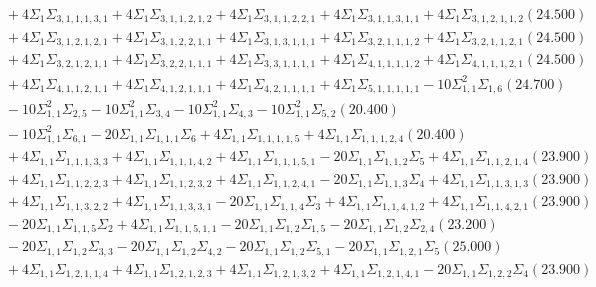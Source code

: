 \documentclass[12pt]{article}
\begin{document}
\begin{landscape}
\begin{align*}
		&\quad\quad +4\Sigma_{1}\Sigma_{3,1,1,1,3,1}+4\Sigma_{1}\Sigma_{3,1,1,2,1,2}+4\Sigma_{1}\Sigma_{3,1,1,2,2,1}+4\Sigma_{1}\Sigma_{3,1,1,3,1,1}+4\Sigma_{1}\Sigma_{3,1,2,1,1,2}(24.500) \\ 
		&\quad\quad +4\Sigma_{1}\Sigma_{3,1,2,1,2,1}+4\Sigma_{1}\Sigma_{3,1,2,2,1,1}+4\Sigma_{1}\Sigma_{3,1,3,1,1,1}+4\Sigma_{1}\Sigma_{3,2,1,1,1,2}+4\Sigma_{1}\Sigma_{3,2,1,1,2,1}(24.500) \\ 
		&\quad\quad +4\Sigma_{1}\Sigma_{3,2,1,2,1,1}+4\Sigma_{1}\Sigma_{3,2,2,1,1,1}+4\Sigma_{1}\Sigma_{3,3,1,1,1,1}+4\Sigma_{1}\Sigma_{4,1,1,1,1,2}+4\Sigma_{1}\Sigma_{4,1,1,1,2,1}(24.500) \\ 
		&\quad\quad +4\Sigma_{1}\Sigma_{4,1,1,2,1,1}+4\Sigma_{1}\Sigma_{4,1,2,1,1,1}+4\Sigma_{1}\Sigma_{4,2,1,1,1,1}+4\Sigma_{1}\Sigma_{5,1,1,1,1,1}-10\Sigma_{1,1}^{2}\Sigma_{1,6}(24.700) \\ 
		&\quad\quad -10\Sigma_{1,1}^{2}\Sigma_{2,5}-10\Sigma_{1,1}^{2}\Sigma_{3,4}-10\Sigma_{1,1}^{2}\Sigma_{4,3}-10\Sigma_{1,1}^{2}\Sigma_{5,2}(20.400) \\ 
		&\quad\quad -10\Sigma_{1,1}^{2}\Sigma_{6,1}-20\Sigma_{1,1}\Sigma_{1,1,1}\Sigma_{6}+4\Sigma_{1,1}\Sigma_{1,1,1,1,5}+4\Sigma_{1,1}\Sigma_{1,1,1,2,4}(20.400) \\ 
		&\quad\quad +4\Sigma_{1,1}\Sigma_{1,1,1,3,3}+4\Sigma_{1,1}\Sigma_{1,1,1,4,2}+4\Sigma_{1,1}\Sigma_{1,1,1,5,1}-20\Sigma_{1,1}\Sigma_{1,1,2}\Sigma_{5}+4\Sigma_{1,1}\Sigma_{1,1,2,1,4}(23.900) \\ 
		&\quad\quad +4\Sigma_{1,1}\Sigma_{1,1,2,2,3}+4\Sigma_{1,1}\Sigma_{1,1,2,3,2}+4\Sigma_{1,1}\Sigma_{1,1,2,4,1}-20\Sigma_{1,1}\Sigma_{1,1,3}\Sigma_{4}+4\Sigma_{1,1}\Sigma_{1,1,3,1,3}(23.900) \\ 
		&\quad\quad +4\Sigma_{1,1}\Sigma_{1,1,3,2,2}+4\Sigma_{1,1}\Sigma_{1,1,3,3,1}-20\Sigma_{1,1}\Sigma_{1,1,4}\Sigma_{3}+4\Sigma_{1,1}\Sigma_{1,1,4,1,2}+4\Sigma_{1,1}\Sigma_{1,1,4,2,1}(23.900) \\ 
		&\quad\quad -20\Sigma_{1,1}\Sigma_{1,1,5}\Sigma_{2}+4\Sigma_{1,1}\Sigma_{1,1,5,1,1}-20\Sigma_{1,1}\Sigma_{1,2}\Sigma_{1,5}-20\Sigma_{1,1}\Sigma_{1,2}\Sigma_{2,4}(23.200) \\ 
		&\quad\quad -20\Sigma_{1,1}\Sigma_{1,2}\Sigma_{3,3}-20\Sigma_{1,1}\Sigma_{1,2}\Sigma_{4,2}-20\Sigma_{1,1}\Sigma_{1,2}\Sigma_{5,1}-20\Sigma_{1,1}\Sigma_{1,2,1}\Sigma_{5}(25.000) \\ 
		&\quad\quad +4\Sigma_{1,1}\Sigma_{1,2,1,1,4}+4\Sigma_{1,1}\Sigma_{1,2,1,2,3}+4\Sigma_{1,1}\Sigma_{1,2,1,3,2}+4\Sigma_{1,1}\Sigma_{1,2,1,4,1}-20\Sigma_{1,1}\Sigma_{1,2,2}\Sigma_{4}(23.900) \\ 

\end{align*}
\end{landscape}
\end{document}
